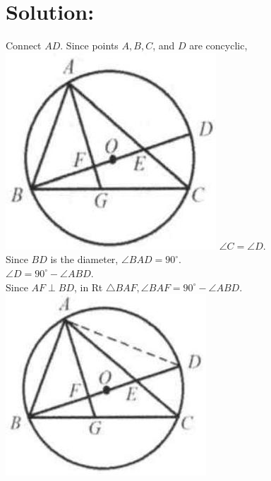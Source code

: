 \documentclass[10pt]{article}
\begin{document}
\section*{Solution:}
Connect \(A D\). Since points \(A, B, C\), and \(D\) are concyclic,\\
\includegraphics[max width=\textwidth]{2025_04_17_97bc1f7e44d93c271a88g-165(4)} \(\angle C=\angle D\).\\
Since \(B D\) is the diameter, \(\angle B A D=90^{\circ}\).\\
\(\angle D=90^{\circ}-\angle A B D\).\\
Since \(A F \perp B D\), in Rt \(\triangle B A F, \angle B A F=90^{\circ}-\angle A B D\).\\
\includegraphics[max width=\textwidth, center]{2025_04_17_97bc1f7e44d93c271a88g-165(2)}
\end{document}
